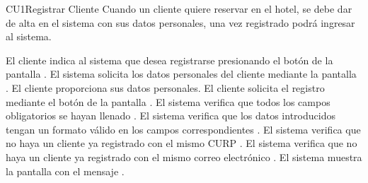 \begin{UseCase}{CU1}{Registrar Cliente}{
	Cuando un cliente quiere reservar en el hotel, se debe dar de alta en el sistema con sus datos personales, una vez registrado podrá ingresar al sistema.
}
{\begin{Titemize}
	\end{Titemize}
	}
\end{UseCase}

\begin{UCtrayectoria}
	\UCpaso[] \label{UC1.paso1}El cliente indica al sistema que desea registrarse presionando el botón  de la pantalla .
    \UCpaso[] \label{UC1.paso2}El sistema solicita los datos personales del cliente mediante la pantalla .
    \UCpaso[] \label{UC1.paso3} El cliente proporciona sus datos personales.
    \UCpaso[] \label{UC1.paso4} El cliente solicita el registro mediante el botón  de la pantalla .
    \UCpaso[] El sistema verifica que todos los campos obligatorios se hayan llenado .
    \UCpaso[] El sistema verifica que los datos introducidos tengan un formato válido en los campos correspondientes .
    \UCpaso[] \label{UC1.paso5} El sistema verifica que no haya un cliente ya registrado con el mismo CURP .
    \UCpaso[] \label{UC1.paso6} El sistema verifica que no haya un cliente ya registrado con el mismo correo electrónico .
    \UCpaso[] \label{UC1.paso7} El sistema muestra la pantalla  con el mensaje .
\end{UCtrayectoria}



